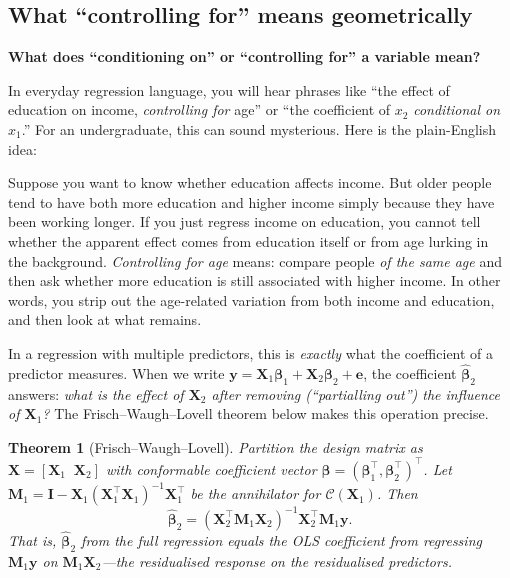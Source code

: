 \documentclass[11pt,a4paper]{article}
\theoremstyle{plain}
\newtheorem{theorem}{Theorem}[section]
\theoremstyle{definition}
\newcommand{\bhat}{\hat{\bm{\beta}}}
\newcommand{\bX}{\bm{X}}
\newcommand{\by}{\bm{y}}
\newcommand{\be}{\bm{e}}
\newcommand{\bM}{\bm{M}}
\newcommand{\bI}{\bm{I}}
\newcommand{\Col}{\mathcal{C}}
\begin{document}
\subsection{What ``controlling for'' means geometrically}

\noindent\textbf{What does ``conditioning on'' or ``controlling for'' a variable mean?}

In everyday regression language, you will hear phrases like
``the effect of education on income, \emph{controlling for} age'' or
``the coefficient of $x_2$ \emph{conditional on} $x_1$.''
For an undergraduate, this can sound mysterious.
Here is the plain-English idea:

Suppose you want to know whether education affects income.
But older people tend to have both more education and higher income simply because they have been working longer.
If you just regress income on education, you cannot tell whether the apparent effect comes from education itself or from age lurking in the background.
\emph{Controlling for age} means: compare people \emph{of the same age} and then ask whether more education is still associated with higher income.
In other words, you strip out the age-related variation from both income and education, and then look at what remains.

In a regression with multiple predictors, this is \emph{exactly} what the
coefficient of a predictor measures. When we write
$\by = \bX_1\bm{\beta}_1 + \bX_2\bm{\beta}_2 + \be$,
the coefficient $\bhat_2$ answers: \emph{what is the effect of $\bX_2$
after removing (``partialling out'') the influence of $\bX_1$?}
The Frisch--Waugh--Lovell theorem below makes this operation precise.

\begin{theorem}[Frisch--Waugh--Lovell]\label{thm:fwl}
Partition the design matrix as $\bX = [\bX_1\;\;\bX_2]$
with conformable coefficient vector $\bm{\beta}=(\bm{\beta}_1^\top,\bm{\beta}_2^\top)^\top$.
Let $\bM_1 = \bI - \bX_1(\bX_1^\top\bX_1)^{-1}\bX_1^\top$ be the
annihilator for $\Col(\bX_1)$.
Then
\begin{equation}\label{eq:fwl}
  \bhat_2 = (\bX_2^\top\bM_1\bX_2)^{-1}\bX_2^\top\bM_1\by.
\end{equation}
That is, $\bhat_2$ from the full regression equals the OLS coefficient
from regressing $\bM_1\by$ on $\bM_1\bX_2$---the
\emph{residualised} response on the \emph{residualised} predictors.
\end{theorem}
\end{document}
